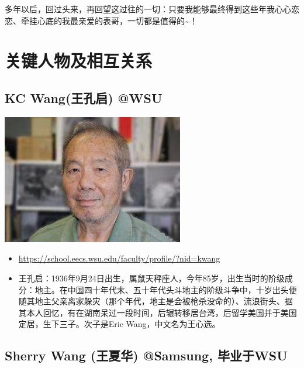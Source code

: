 \documentclass[9pt, b5paper]{article}
\begin{document}
多年以后，回过头来，再回望这过往的一切：只要我能够最终得到这些年我心心恋恋、牵挂心底的我最亲爱的表哥，一切都是值得的\textasciitilde{}！


\section{关键人物及相互关系}
\label{sec:org6287e34}
\subsection{KC Wang(王孔启) @WSU}
\label{sec:org2a23225}

\begin{center}
\includegraphics[width=.9\linewidth]{./pic/KCWang.jpg}
\end{center}
\begin{itemize}
\item \url{https://school.eecs.wsu.edu/faculty/profile/?nid=kwang}
\item 王孔启：1936年9月24日出生，属鼠天秤座人，今年85岁，出生当时的阶级成分：地主。在中国四十年代末、五十年代头斗地主的阶级斗争中，十岁出头便随其地主父亲离家躲灾（那个年代，地主是会被枪杀没命的）、流浪街头、据其本人回忆，有在湖南呆过一段时间，后辗转移居台湾，后留学美国并于美国定居，生下三子。次子是Eric Wang，中文名为王心选。
\end{itemize}
\subsection{Sherry Wang (王夏华) @Samsung, 毕业于WSU}
\label{sec:orga8f1af2}
\end{document}
